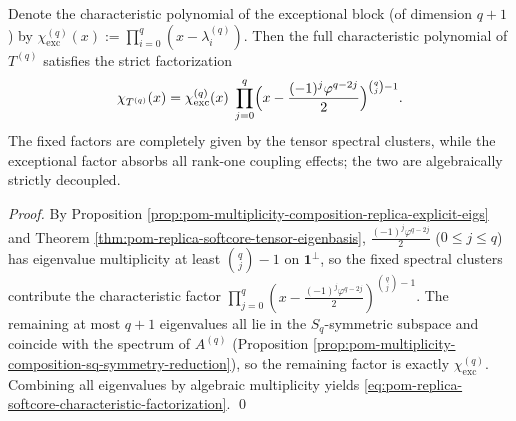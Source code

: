 \begin{theorem}\label{thm:pom-replica-softcore-characteristic-factorization}
Denote the characteristic polynomial of the exceptional block (of dimension \(q+1\)) by
\(
\chi_{\mathrm{exc}}^{(q)}(x):=\prod_{i=0}^{q}(x-\lambda_i^{(q)})
\).
Then the full characteristic polynomial of \(T^{(q)}\) satisfies the strict factorization
\begin{equation}\label{eq:pom-replica-softcore-characteristic-factorization}
\chi_{T^{(q)}}(x)
=\chi_{\mathrm{exc}}^{(q)}(x)\;
\prod_{j=0}^{q}\Bigl(x-\frac{(-1)^j\varphi^{q-2j}}{2}\Bigr)^{\binom{q}{j}-1}.
\end{equation}
The fixed factors are completely given by the tensor spectral clusters, while the exceptional factor absorbs all rank-one coupling effects; the two are algebraically strictly decoupled.
\end{theorem}
\begin{proof}
By Proposition \ref{prop:pom-multiplicity-composition-replica-explicit-eigs} and Theorem \ref{thm:pom-replica-softcore-tensor-eigenbasis},
\(\frac{(-1)^j\varphi^{q-2j}}{2}\) (\(0\le j\le q\)) has eigenvalue multiplicity at least \(\binom{q}{j}-1\) on \(\mathbf{1}^\perp\),
so the fixed spectral clusters contribute the characteristic factor
\(
\prod_{j=0}^{q}(x-\frac{(-1)^j\varphi^{q-2j}}{2})^{\binom{q}{j}-1}
\).
The remaining at most \(q+1\) eigenvalues all lie in the \(S_q\)-symmetric subspace and coincide with the spectrum of \(A^{(q)}\) (Proposition \ref{prop:pom-multiplicity-composition-sq-symmetry-reduction}),
so the remaining factor is exactly \(\chi_{\mathrm{exc}}^{(q)}\).
Combining all eigenvalues by algebraic multiplicity yields \eqref{eq:pom-replica-softcore-characteristic-factorization}. \qed
\end{proof}

